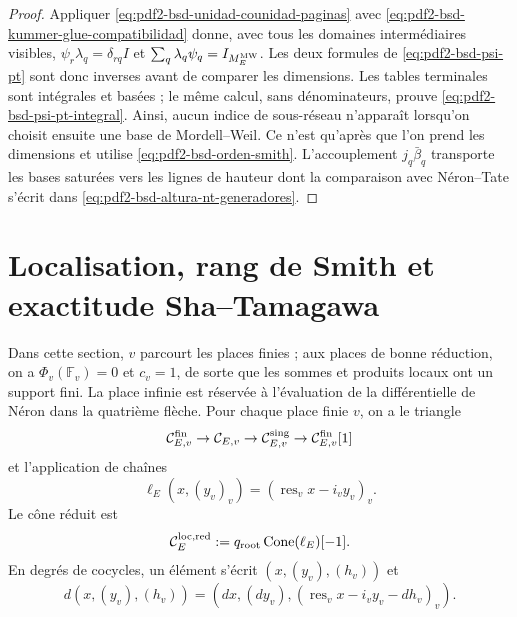 \begin{proof}
Appliquer \eqref{eq:pdf2-bsd-unidad-counidad-paginas} avec
\eqref{eq:pdf2-bsd-kummer-glue-compatibilidad} donne, avec tous les domaines
intermédiaires visibles,
$\psi_r\lambda_q=\delta_{rq}I$ et
$\sum_q\lambda_q\psi_q=I_{M_E^{\rm MW}}$. Les deux formules de
\eqref{eq:pdf2-bsd-psi-pt} sont donc inverses avant de comparer les dimensions.
Les tables terminales sont intégrales et basées ; le même calcul, sans
dénominateurs, prouve \eqref{eq:pdf2-bsd-psi-pt-integral}. Ainsi, aucun indice de
sous-réseau n'apparaît lorsqu'on choisit ensuite une base de Mordell--Weil.
Ce n'est qu'après que l'on prend les dimensions et utilise
\eqref{eq:pdf2-bsd-orden-smith}. L'accouplement
$j_q\bar\beta_q$ transporte les bases saturées vers les lignes de hauteur dont la
comparaison avec Néron--Tate s'écrit dans
\eqref{eq:pdf2-bsd-altura-nt-generadores}.
\end{proof}

\section{Localisation, rang de Smith et exactitude Sha--Tamagawa}

Dans cette section, $v$ parcourt les places finies ; aux places de bonne réduction, on
a $\Phi_v(\mathbb F_v)=0$ et $c_v=1$, de sorte que les sommes et produits
locaux ont un support fini. La place infinie est réservée à l'évaluation
de la différentielle de Néron dans la quatrième flèche. Pour chaque place finie $v$, on
a le triangle
\[
 \mathcal C_{E,v}^{\rm fin}\to\mathcal C_{E,v}\to
 \mathcal C_{E,v}^{\rm sing}\to\mathcal C_{E,v}^{\rm fin}[1]
\]
et l'application de chaînes
\begin{equation}\label{eq:pdf2-bsd-ell-e}
 \ell_E(x,(y_v)_v)=(\operatorname{res}_vx-i_vy_v)_v.
\end{equation}
Le cône réduit est
\begin{equation}\label{eq:pdf2-bsd-cono-reducido}
 \mathcal C_E^{\rm loc,red}:=
 q_{\rm root}\operatorname{Cone}(\ell_E)[-1].
\end{equation}
En degrés de cocycles, un élément s'écrit $(x,(y_v),(h_v))$ et
\begin{equation}\label{eq:pdf2-bsd-diferencial-cono}
 d(x,(y_v),(h_v))=
 (dx,(dy_v),(\operatorname{res}_vx-i_vy_v-dh_v)_v).
\end{equation}

